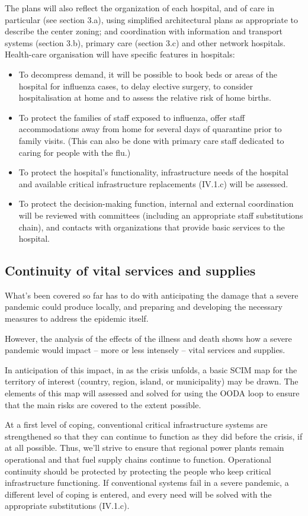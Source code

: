 \documentclass[12pt, a4]{scrartcl}
\begin{document}
The plans will also reflect the organization of each hospital, and of care in particular (see section 3.a), using simplified architectural plans as appropriate to describe the center zoning; and coordination with information and transport systems (section 3.b), primary care (section 3.c) and other network hospitals. Health-care organisation will have specific features in hospitals:
\begin{itemize}
	\item To decompress demand, it will be possible to book beds or areas of the hospital for influenza cases, to delay elective surgery, to consider hospitalisation at home and to assess the relative risk of home births.
	\item To protect the families of staff exposed to influenza, offer staff accommodations away from home for several days of quarantine prior to family visits. (This can also be done with primary care staff dedicated to caring for people with the flu.)
	\item To protect the hospital’s functionality, infrastructure needs of the hospital and available critical infrastructure replacements (IV.1.c) will be assessed.
	\item To protect the decision-making function, internal and external coordination will be reviewed with committees (including an appropriate staff substitutions chain), and contacts with organizations that provide basic services to the hospital.
\end{itemize}

\subsection{Continuity of vital services and supplies}
What’s been covered so far has to do with anticipating the damage that a severe pandemic could produce locally, and preparing and developing the necessary measures to address the epidemic itself. 

However, the analysis of the effects of the illness and death shows how a severe pandemic would impact – more or less intensely – vital services and supplies.

In anticipation of this impact, in as the crisis unfolds, a basic SCIM map for the territory of interest (country, region, island, or municipality) may be drawn. The elements of this map will assessed and solved for using the OODA loop to ensure that the main risks are covered to the extent possible. 

At a first level of coping, conventional critical infrastructure systems are strengthened so that they can continue to function as they did before the crisis, if at all possible. Thus, we’ll strive to ensure that regional power plants remain operational and that fuel supply chains continue to function. Operational continuity should be protected by protecting the people who keep critical infrastructure functioning. If conventional systems fail in a severe pandemic, a different level of coping is entered, and every need will be solved with the appropriate substitutions (IV.1.c).
\end{document}
